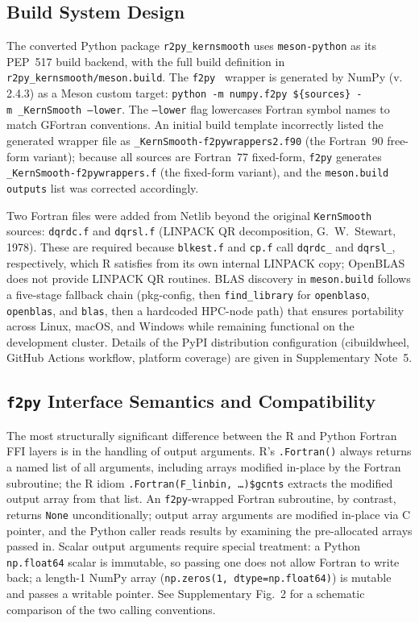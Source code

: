 \documentclass[12pt,a4paper]{article}
\newcommand{\pkg}[1]{\texttt{#1}}
\newcommand{\suppnote}[1]{Supplementary Note~#1}
\newcommand{\suppfig}[1]{Supplementary Fig.~#1}
\begin{document}
\subsection{Build System Design}

The converted Python package \pkg{r2py\_kernsmooth} uses \texttt{meson-python} as its PEP~517 build backend, with the full build definition in \texttt{r2py\_kernsmooth/meson.build}. The \pkg{f2py}~\cite{peterson2009f2py} wrapper is generated by NumPy (v.\,2.4.3) as a Meson custom target: \texttt{python~-m~numpy.f2py~\$\{sources\}~-m~\_KernSmooth~--lower}. The \texttt{--lower} flag lowercases Fortran symbol names to match GFortran conventions. An initial build template incorrectly listed the generated wrapper file as \texttt{\_KernSmooth-f2pywrappers2.f90} (the Fortran~90 free-form variant); because all sources are Fortran~77 fixed-form, \pkg{f2py} generates \texttt{\_KernSmooth-f2pywrappers.f} (the fixed-form variant), and the \texttt{meson.build} \texttt{outputs} list was corrected accordingly.

Two Fortran files were added from Netlib beyond the original \pkg{KernSmooth} sources: \texttt{dqrdc.f} and \texttt{dqrsl.f} (LINPACK QR decomposition, G.~W.~Stewart, 1978). These are required because \texttt{blkest.f} and \texttt{cp.f} call \texttt{dqrdc\_} and \texttt{dqrsl\_}, respectively, which R satisfies from its own internal LINPACK copy; OpenBLAS does not provide LINPACK QR routines. BLAS discovery in \texttt{meson.build} follows a five-stage fallback chain (pkg-config, then \texttt{find\_library} for \texttt{openblaso}, \texttt{openblas}, and \texttt{blas}, then a hardcoded HPC-node path) that ensures portability across Linux, macOS, and Windows while remaining functional on the development cluster. Details of the PyPI distribution configuration (cibuildwheel, GitHub Actions workflow, platform coverage) are given in \suppnote{5}.

\subsection{\pkg{f2py} Interface Semantics and Compatibility}

The most structurally significant difference between the R and Python Fortran FFI layers is in the handling of output arguments. R's \texttt{.Fortran()} always returns a named list of all arguments, including arrays modified in-place by the Fortran subroutine; the R idiom \texttt{.Fortran(F\_linbin,~\ldots)\$gcnts} extracts the modified output array from that list. An \pkg{f2py}-wrapped Fortran subroutine, by contrast, returns \texttt{None} unconditionally; output array arguments are modified in-place via C pointer, and the Python caller reads results by examining the pre-allocated arrays passed in. Scalar output arguments require special treatment: a Python \texttt{np.float64} scalar is immutable, so passing one does not allow Fortran to write back; a length-1 NumPy array (\texttt{np.zeros(1, dtype=np.float64)}) is mutable and passes a writable pointer. See \suppfig{2} for a schematic comparison of the two calling conventions.
\end{document}
